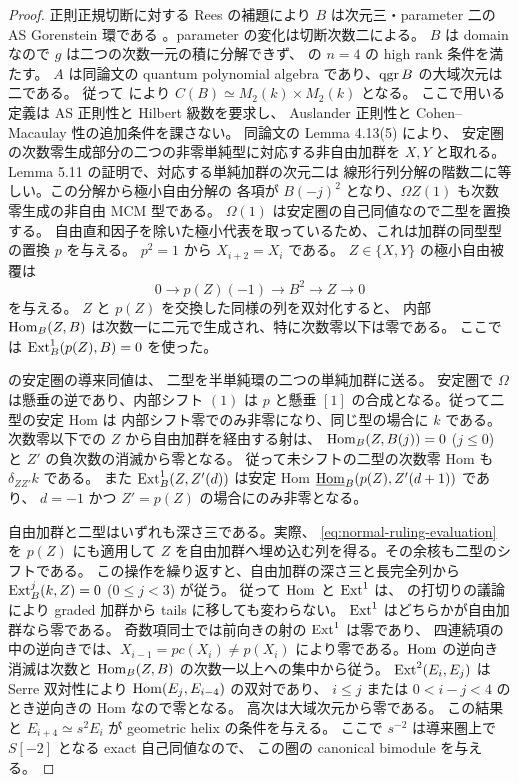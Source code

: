 \begin{proof}
正則正規切断に対する Rees の補題により $B$ は次元三・parameter 二の
AS Gorenstein 環である
\cite[Lemma 2.4]{MU2022}。parameter の変化は切断次数二による。
$B$ は domain なので $g$ は二つの次数一元の積に分解できず、
\cite[Definitions 4.10 and 5.9]{MU2022} の $n=4$ の high rank 条件を満たす。
$A$ は同論文の quantum polynomial algebra であり、$\operatorname{qgr} B$ の大域次元は二である。
従って \cite[Theorem 5.5, Lemma 5.13(4)]{MU2022} により
$C(B)\simeq M_2(k)\times M_2(k)$ となる。
ここで用いる定義は AS 正則性と Hilbert 級数を要求し、
Auslander 正則性と Cohen--Macaulay 性の追加条件を課さない。
同論文の Lemma 4.13(5) により、
安定圏の次数零生成部分の二つの非零単純型に対応する非自由加群を $X,Y$ と取れる。
Lemma 5.11 の証明で、対応する単純加群の次元二は
線形行列分解の階数二に等しい。この分解から極小自由分解の
各項が $B(-j)^2$ となり、$\Omega Z(1)$ も次数零生成の非自由 MCM 型である。
$\Omega(1)$ は安定圏の自己同値なので二型を置換する。
自由直和因子を除いた極小代表を取っているため、これは加群の同型型の置換 $p$ を与える。
$p^2=1$ から $X_{i+2}=X_i$ である。
$Z\in\{X,Y\}$ の極小自由被覆は
\begin{equation}
 0\longrightarrow p(Z)(-1)\longrightarrow B^2\longrightarrow Z
 \longrightarrow0
 \label{eq:normal-ruling-evaluation}
\end{equation}
を与える。
$Z$ と $p(Z)$ を交換した同様の列を双対化すると、
内部 $\operatorname{Hom}_B(Z,B)$ は次数一に二元で生成され、特に次数零以下は零である。
ここでは $\operatorname{Ext}_B^1(p(Z),B)=0$ を使った。

\cite[Lemma 4.13(3)--(5)]{MU2022} の安定圏の導来同値は、
二型を半単純環の二つの単純加群に送る。
安定圏で $\Omega$ は懸垂の逆であり、内部シフト $(1)$ は
$p$ と懸垂 $[1]$ の合成となる。従って二型の安定 Hom は
内部シフト零でのみ非零になり、同じ型の場合に $k$ である。
次数零以下での $Z$ から自由加群を経由する射は、
$\operatorname{Hom}_B(Z,B(j))=0$ ($j\le0$) と $Z'$ の負次数の消滅から零となる。
従って未シフトの二型の次数零 Hom も $\delta_{ZZ'}k$ である。
また $\operatorname{Ext}_B^1(Z,Z'(d))$ は安定 Hom
$\underline{\operatorname{Hom}}_B(p(Z),Z'(d+1))$ であり、
$d=-1$ かつ $Z'=p(Z)$ の場合にのみ非零となる。

自由加群と二型はいずれも深さ三である。実際、
\eqref{eq:normal-ruling-evaluation} を $p(Z)$ にも適用して
$Z$ を自由加群へ埋め込む列を得る。その余核も二型のシフトである。
この操作を繰り返すと、自由加群の深さ三と長完全列から
$\operatorname{Ext}^j_B(k,Z)=0$ ($0\le j<3$) が従う。
従って $\operatorname{Hom}$ と $\operatorname{Ext}^1$ は、\cite[Lemma 5.9(1)--(2)]{MU2021}
の打切りの議論により graded 加群から tails に移しても変わらない。
$\operatorname{Ext}^1$ はどちらかが自由加群なら零である。
奇数項同士では前向きの射の $\operatorname{Ext}^1$ は零であり、
四連続項の中の逆向きでは、$X_{i-1}=pc(X_i)\ne p(X_i)$
により零である。$\operatorname{Hom}$ の逆向き消滅は次数と
$\operatorname{Hom}_B(Z,B)$ の次数一以上への集中から従う。
$\operatorname{Ext}^2(E_i,E_j)$ は Serre 双対性により $\operatorname{Hom}(E_j,E_{i-4})$ の双対であり、
$i\le j$ または $0<i-j<4$ のとき逆向きの Hom なので零となる。
高次は大域次元から零である。
この結果と $E_{i+4}\simeq s^2E_i$ が geometric helix の条件を与える。
ここで $s^{-2}$ は導来圏上で $S[-2]$ となる exact 自己同値なので、
この圏の canonical bimodule を与える。


\end{proof}
